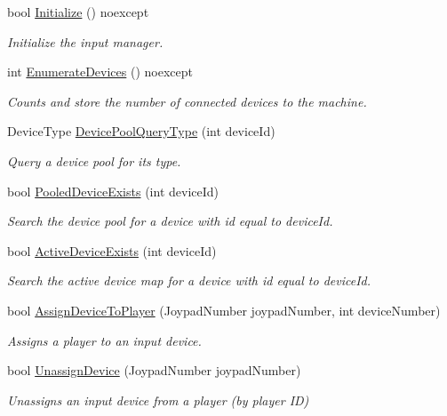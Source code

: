 \begin{DoxyCompactItemize}
bool \hyperlink{class_blade_1_1_input_manager_a979db0aea29e22ed95c2642649922a41}{Initialize} () noexcept
\begin{DoxyCompactList}\small\item\em Initialize the input manager. \end{DoxyCompactList}\item 
int \hyperlink{class_blade_1_1_input_manager_afdb7935349eacd9dab51a5b06c8d3864}{Enumerate\+Devices} () noexcept
\begin{DoxyCompactList}\small\item\em Counts and store the number of connected devices to the machine. \end{DoxyCompactList}\item 
Device\+Type \hyperlink{class_blade_1_1_input_manager_a308a056833ddd9aa528ac4fbdbf9df4c}{Device\+Pool\+Query\+Type} (int device\+Id)
\begin{DoxyCompactList}\small\item\em Query a device pool for its type. \end{DoxyCompactList}\item 
bool \hyperlink{class_blade_1_1_input_manager_ae3ccc72d662ee90161206ef64722380f}{Pooled\+Device\+Exists} (int device\+Id)
\begin{DoxyCompactList}\small\item\em Search the device pool for a device with id equal to device\+Id. \end{DoxyCompactList}\item 
bool \hyperlink{class_blade_1_1_input_manager_a6aadb5a4fd8ccfe2de69c1f2d62df37d}{Active\+Device\+Exists} (int device\+Id)
\begin{DoxyCompactList}\small\item\em Search the active device map for a device with id equal to device\+Id. \end{DoxyCompactList}\item 
bool \hyperlink{class_blade_1_1_input_manager_a5369c3110e39e5b3d01349ce7aa676ed}{Assign\+Device\+To\+Player} (Joypad\+Number joypad\+Number, int device\+Number)
\begin{DoxyCompactList}\small\item\em Assigns a player to an input device. \end{DoxyCompactList}\item 
bool \hyperlink{class_blade_1_1_input_manager_ab436b8828eb3022334b544f8e201249e}{Unassign\+Device} (Joypad\+Number joypad\+Number)
\begin{DoxyCompactList}\small\item\em Unassigns an input device from a player (by player ID) \end{DoxyCompactList}\item 

\end{DoxyCompactItemize}
